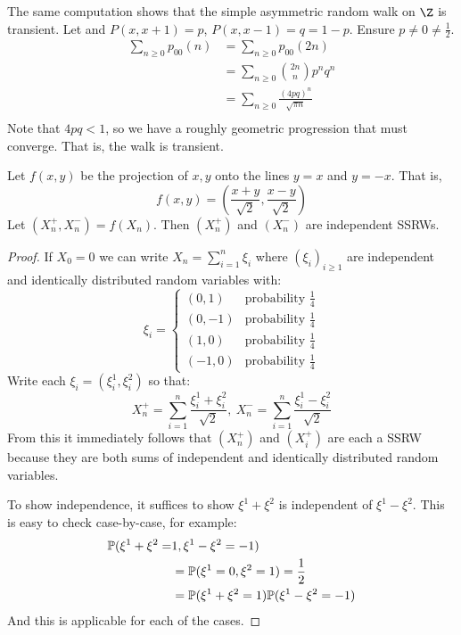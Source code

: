 \documentclass[../Main.tex]{subfiles}
\begin{document}
\begin{remark}
    The same computation shows that the simple asymmetric random walk on $\Z$ is transient. Let and $P(x, x+1) = p$, $P(x, x-1) = q = 1-p$. Ensure $p \neq 0 \neq \frac12$.
    \begin{align*}
        \sum_{n\geq 0}p_{00}(n)&= \sum_{n\geq 0} p_{00}(2n) \\
        &= \sum_{n \geq 0} \binom{2n}{n} p^n q^n \\
        &= \sum_{n \geq 0} \frac{(4pq)^n}{\sqrt{\pi n}} \\
    \end{align*}
    Note that $4pq < 1$, so we have a roughly geometric progression that must converge. That is, the walk is transient.
\end{remark}
\begin{lemma}
    Let $f(x, y)$ be the projection of $x, y$ onto the lines $y = x$ and $y = -x$. That is,
    \begin{equation*}
        f(x, y) = \left(\frac{x + y}{\sqrt{2}}, \frac{x-y}{\sqrt{2}}\right)
    \end{equation*}
    Let $(X_n^+, X_n^-) = f(X_n)$. Then $(X_n^+)$ and $(X_n^-)$ are independent SSRWs.
    \label{lemProjectionRW}
\end{lemma}
\begin{proof}
    If $X_0 = 0$ we can write $X_n = \sum_{i=1}^n \xi_i$ where $(\xi_i)_{i \geq 1}$ are independent and identically distributed random variables with:
    \begin{equation*}
       \xi_i =
       \begin{cases}
        (0, 1) & \text{probability } \frac14 \\
        (0, -1) & \text{probability } \frac14 \\
        (1, 0) & \text{probability } \frac14 \\
        (-1, 0) & \text{probability } \frac14
       \end{cases} 
    \end{equation*}
    Write each $\xi_i = (\xi_i^1, \xi_i^2)$ so that:
    \begin{equation*}
        X_n^+ = \sum_{i=1}^{n} \frac{\xi_i^1 +\xi_i^2}{\sqrt{2}},~X_n^- = \sum_{i=1}^{n} \frac{\xi_i^1 -\xi_i^2}{\sqrt{2}}
    \end{equation*}
    From this it immediately follows that $(X_n^+)$ and $(X_i^+)$ are each a SSRW because they are both sums of independent and identically distributed random variables.

    To show independence, it suffices to show $\xi^1 + \xi^2$ is independent of $\xi^1 - \xi^2$. This is easy to check case-by-case, for example:
    \begin{align*}
        \P(\xi^1 + \xi^2 =& 1, \xi^1 - \xi^2 = -1) \\
        &= \P(\xi^1 = 0, \xi^2 = 1) = \frac12 \\
        &= \P(\xi^1 + \xi^2 = 1) \P(\xi^1 - \xi^2 = -1)
    \end{align*}
    And this is applicable for each of the cases.
\end{proof}
\end{document}
